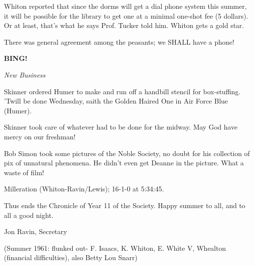 \documentclass[12pt]{article}
\newcommand{\bing}{{\bf BING!} }
\newcommand{\goto}[1]{\bing \vskip 12pt \centerline{{\em{#1}}}}
\begin{document}
Whiton reported that since the dorms will get a dial phone system this summer, it will be possible for the library to get one at a minimal one-shot fee (5 dollars). Or at least, that's what he says Prof. Tucker told him. Whiton gets a gold star.

There was general agreement among the peasants; we SHALL have a phone!

\goto{New Business}

Skinner ordered Humer to make and run off a handbill stencil for box-stuffing. 'Twill be done Wednesday, saith the Golden Haired One in Air Force Blue (Humer).

Skinner took care of whatever had to be done for the midway. May God have mercy on our freshman!

Bob Simon took some pictures of the Noble Society, no doubt for his collection of pix of unnatural phenomena. He didn't even get Deanne in the picture. What a waste of film!

Milleration (Whiton-Ravin/Lewis); 16-1-0 at 5:34:45.

Thus ends the Chronicle of Year 11 of the Society. Happy summer to all, and to all a good night.

\vspace{12pt}

\centerline{Jon Ravin, Secretary}

(Summer 1961: flunked out- F. Isaacs, K. Whiton, E. White V, Whealton (financial difficulties), also Betty Lou Snarr)
\end{document}
